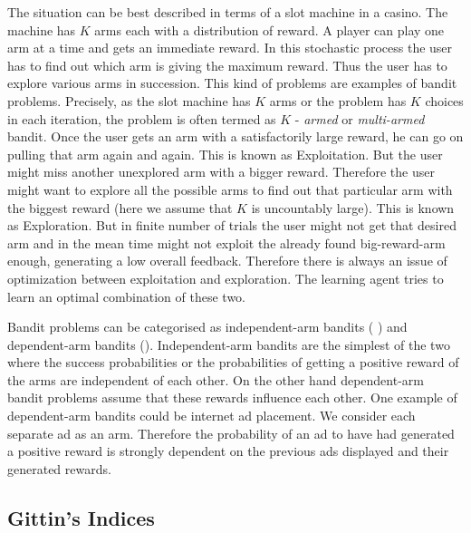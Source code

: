 \documentclass[english]{tktltiki}
\begin{document}
The situation can be best described in terms of a slot machine in a casino. The machine has $K$ arms each with a distribution of reward. A player can play one arm at a time and gets an immediate reward. In this stochastic process the user has to find out which arm is giving the maximum reward. Thus the user has to explore various arms in succession. This kind of problems are examples of bandit problems. Precisely, as the slot machine has $K$ arms or the problem has $K$ choices in each iteration, the problem is often termed as $K$ - \textit{armed} or \textit{multi-armed} bandit. Once the user gets an arm with a satisfactorily large reward, he can go on pulling that arm again and again. This is known as Exploitation. But the user might miss another unexplored arm with a bigger reward. Therefore the user might want to explore all the possible arms to find out that particular arm with the biggest reward (here we assume that $K$ is uncountably large). This is known as Exploration. But in finite number of trials the user might not get that desired arm and in the mean time might not exploit the already found big-reward-arm enough, generating a low overall feedback. Therefore there is always an issue of optimization between exploitation and exploration. The learning agent tries to learn an optimal combination of these two.

Bandit problems can be categorised as independent-arm bandits (\cite{independent_arm_bandits_1} \cite{independent_arm_bandits_2}) and dependent-arm bandits (\cite{dependent_arm_bandits}). Independent-arm bandits are the simplest of the two where the success probabilities or the probabilities of getting a positive reward of the arms are independent of each other. On the other hand dependent-arm bandit problems assume that these rewards influence each other. One example of dependent-arm bandits could be internet ad placement. We consider each separate ad as an arm. Therefore the probability of an ad to have had generated a positive reward is strongly dependent on the previous ads displayed and their generated rewards.

\subsection{Gittin's Indices}
\end{document}
